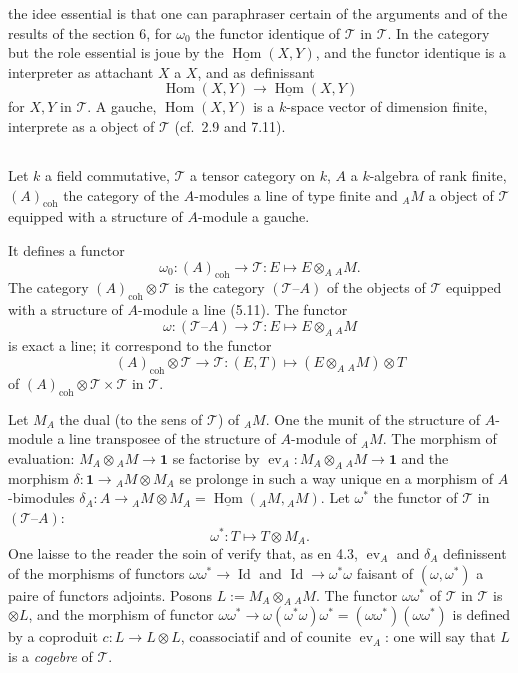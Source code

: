 \documentclass[12pt,a4paper]{article}
\theoremstyle{plain}
\theoremstyle{definition}
\DeclareMathOperator{\Hom}{Hom}
\DeclareMathOperator{\Id}{Id}
\DeclareMathOperator{\ev}{ev}
\newcommand{\coh}{\mathrm{coh}}
\begin{document}
the idee essential is that one can paraphraser certain of the arguments and of the results of the section 6, for $\omega_0$ the functor identique of $\mathcal{T}$ in $\mathcal{T}$. In the category but the role essential is joue by the $\underline{\Hom}(X, Y)$, and the functor identique is a interpreter as attachant $X$ a $X$, and as definissant
\[
\Hom(X, Y) \to \underline{\Hom}(X, Y)
\]
for $X, Y$ in $\mathcal{T}$. A gauche, $\Hom(X, Y)$ is a $k$-space vector of dimension finite, interprete as a object of $\mathcal{T}$ (cf.~2.9 and 7.11).

\subsection{}

Let $k$ a field commutative, $\mathcal{T}$ a tensor category on $k$, $A$ a $k$-algebra of rank finite, $(A)_{\coh}$ the category of the $A$-modules a line of type finite and $_A M$ a object of $\mathcal{T}$ equipped with a structure of $A$-module a gauche.

It defines a functor
\[
\omega_0 : (A)_{\coh} \to \mathcal{T} : E \mapsto E \otimes_A {_A M}.
\]
The category $(A)_{\coh} \otimes \mathcal{T}$ is the category $(\mathcal{T} \text{--} A)$ of the objects of $\mathcal{T}$ equipped with a structure of $A$-module a line (5.11). The functor
\[
\omega : (\mathcal{T} \text{--} A) \to \mathcal{T} : E \mapsto E \otimes_A {_A M}
\]
is exact a line; it correspond to the functor
\[
(A)_{\coh} \otimes \mathcal{T} \to \mathcal{T} : (E, T) \mapsto (E \otimes_A {_A M}) \otimes T
\]
of $(A)_{\coh} \otimes \mathcal{T} \times \mathcal{T}$ in $\mathcal{T}$.

Let $M_A$ the dual (to the sens of $\mathcal{T}$) of $_A M$. One the munit of the structure of $A$-module a line transposee of the structure of $A$-module of $_A M$. The morphism of evaluation: $M_A \otimes {_A M} \to \mathbf{1}$ se factorise by $\ev_A : M_A \otimes_A {_A M} \to \mathbf{1}$ and the morphism $\delta : \mathbf{1} \to {_A M} \otimes M_A$ se prolonge in such a way unique en a morphism of $A$-bimodules $\delta_A : A \to {_A M} \otimes M_A = \underline{\Hom}({_A M}, {_A M})$. Let $\omega^*$ the functor of $\mathcal{T}$ in $(\mathcal{T} \text{--} A)$:
\[
\omega^* : T \mapsto T \otimes M_A.
\]
One laisse to the reader the soin of verify that, as en 4.3, $\ev_A$ and $\delta_A$ definissent of the morphisms of functors $\omega\omega^* \to \Id$ and $\Id \to \omega^*\omega$ faisant of $(\omega, \omega^*)$ a paire of functors adjoints. Posons $L := M_A \otimes_A {_A M}$. The functor $\omega\omega^*$ of $\mathcal{T}$ in $\mathcal{T}$ is $\otimes L$, and the morphism of functor $\omega\omega^* \to \omega(\omega^*\omega)\omega^* = (\omega\omega^*)(\omega\omega^*)$ is defined by a coproduit $c : L \to L \otimes L$, coassociatif and of counite $\ev_A$: one will say that $L$ is a \emph{cogebre} of $\mathcal{T}$.
\end{document}
